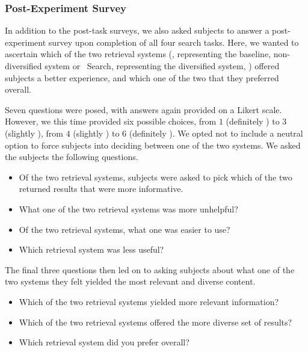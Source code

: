 \subsubsection{Post-Experiment Survey}\label{sec:diversity:users:postexp}
In addition to the post-task surveys, we also asked subjects to answer a post-experiment survey upon completion of all four search tasks. Here, we wanted to ascertain which of the two retrieval systems (\hula, representing the baseline, non-diversified system  or \yoyo~Search, representing the diversified system, ) offered subjects a better experience, and which one of the two that they preferred overall.

Seven questions were posed, with answers again provided on a Likert scale. However, we this time provided six possible choices, from $1$ (definitely \hula) to $3$ (slightly \hula), from $4$ (slightly \yoyo) to $6$ (definitely \yoyo). We opted not to include a neutral option to force subjects into deciding between one of the two systems. We asked the subjects the following questions.

\begin{itemize}
    \item{ Of the two retrieval systems, subjects were asked to pick which of the two returned results that were more informative.}
    \item{ What one of the two retrieval systems was more unhelpful?}
    \item{ Of the two retrieval systems, what one was easier to use?}
    \item{ Which retrieval system was less useful?}
\end{itemize}

The final three questions then led on to asking subjects about what one of the two systems they felt yielded the most relevant and diverse content.

\begin{itemize}
    \item{ Which of the two retrieval systems yielded more relevant information?}
    \item{ Which of the two retrieval systems offered the more diverse set of results?}
    \item{ Which retrieval system did you prefer overall?}
\end{itemize}

